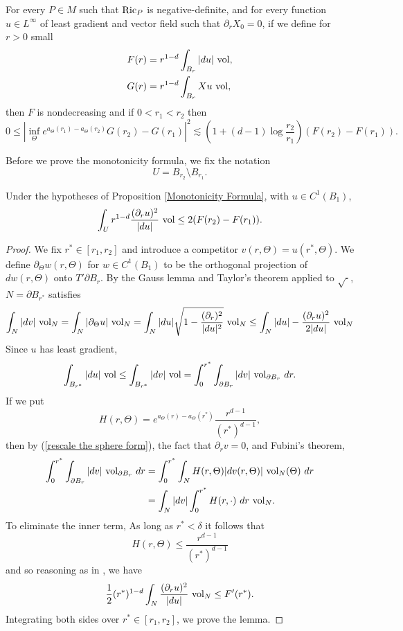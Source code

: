 \begin{proposition}\label{Monotonicity Formula}
For every $P \in M$ such that $\mathrm{Ric}_P$ is negative-definite, and for every function $u \in L^\infty$ of least gradient and vector field such that $\partial_r X_0 = 0$, if we define for $r > 0$ small
\begin{align*}
    F(r) &= r^{1 - d} \int_{B_r} |du| ~\mathrm{vol},\\
    G(r) &= r^{1 - d} \int_{B_r} Xu ~\mathrm{vol},
\end{align*}
then $F$ is nondecreasing and if $0 < r_1 < r_2$ then
\begin{equation}\label{StrongMonotonicity}
0 \leq \left|\inf_\Theta e^{a_\Theta(r_1) - a_\Theta(r_2)}G(r_2) - G(r_1)\right|^2 \lesssim \left(1 + (d - 1)\log \frac{r_2}{r_1}\right)(F(r_2) - F(r_1)).
\end{equation}
\end{proposition}

Before we prove the monotonicity formula, we fix the notation
$$U = B_{r_2} \setminus B_{r_1}.$$

\begin{lemma}\label{monotonicity lemma}
Under the hypotheses of Proposition \ref{Monotonicity Formula}, with $u \in C^1(B_1)$,
$$\int_U r^{1 - d}\frac{(\partial_ru)^2}{|du|} ~\mathrm{vol} \leq 2(F(r_2) - F(r_1)).$$
\end{lemma}
\begin{proof}
We fix $r^* \in [r_1, r_2]$ and introduce a competitor $v(r, \Theta) = u(r^*, \Theta)$. We define $\partial_\Theta w(r, \Theta)$ for $w \in C^1(B_1)$ to be the orthogonal projection of $dw(r, \Theta)$ onto $T'\partial B_r$.
By the Gauss lemma and Taylor's theorem applied to $\sqrt\cdot$, $N = \partial B_{r^*}$ satisfies
\begin{align*}
\int_N |dv| ~\mathrm{vol}_N = \int_N |\partial_\Theta u| ~\mathrm{vol}_N = \int_N |du|\sqrt{1 - \frac{(\partial_r)^2}{|du|^2}} ~\mathrm{vol}_N \leq \int_N |du| - \frac{(\partial_ru)^2}{2|du|} ~\mathrm{vol}_N
\end{align*}
Since $u$ has least gradient, 
$$\int_{B_{r^*}} |du| ~\mathrm{vol} \leq \int_{B_{r^*}} |dv| ~\mathrm{vol} = \int_0^{r^*} \int_{\partial B_r} |dv| ~\mathrm{vol}_{\partial B_r} ~dr.$$
If we put 
$$H(r, \Theta) = e^{a_\Theta(r) - a_\Theta(r^*)} \frac{r^{d - 1}}{(r^*)^{d - 1}},$$
then by (\ref{rescale the sphere form}), the fact that $\partial_r v = 0$, and Fubini's theorem,
\begin{align*}
    \int_0^{r^*} \int_{\partial B_r} |dv| ~\mathrm{vol}_{\partial B_r} ~dr &= \int_0^{r^*} \int_N H(r, \Theta) |dv(r, \Theta)| ~\mathrm{vol}_N(\Theta) ~dr\\
    &= \int_N |dv| \int_0^{r^*} H(r, \cdot) ~dr ~\mathrm{vol}_N.
\end{align*}
To eliminate the inner term, 
As long as $r^* < \delta$ it follows that 
$$H(r, \Theta) \leq \frac{r^{d - 1}}{(r^*)^{d - 1}}$$
and so reasoning as in \cite[pg68]{Giusti77}, we have 
$$\frac{1}{2} (r^*)^{1 - d} \int_N \frac{(\partial_ru)^2}{|du|} ~\mathrm{vol}_N \leq F'(r^*).$$
Integrating both sides over $r^* \in [r_1, r_2]$, we prove the lemma.
\end{proof}

